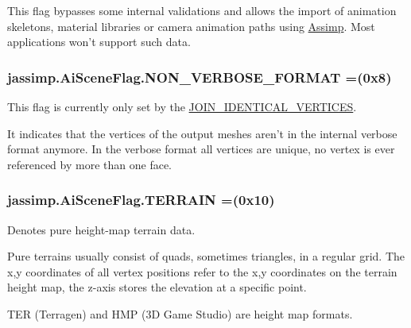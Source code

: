 This flag bypasses some internal validations and allows the import of animation skeletons, material libraries or camera animation paths using \hyperlink{class_assimp}{Assimp}. Most applications won't support such data. \hypertarget{enumjassimp_1_1_ai_scene_flag_a122fd9086bf97b49ca1331e0fe115fad}{
\subsubsection[{N\+O\+N\+\_\+\+V\+E\+R\+B\+O\+S\+E\+\_\+\+F\+O\+R\+M\+A\+T}]{\setlength{\rightskip}{0pt plus 5cm}jassimp.\+Ai\+Scene\+Flag.\+N\+O\+N\+\_\+\+V\+E\+R\+B\+O\+S\+E\+\_\+\+F\+O\+R\+M\+A\+T =(0x8)}}\label{enumjassimp_1_1_ai_scene_flag_a122fd9086bf97b49ca1331e0fe115fad}
This flag is currently only set by the \hyperlink{enumjassimp_1_1_ai_post_process_steps_a8a0dc401e418d7e18272cb5bac85ca45}{J\+O\+I\+N\+\_\+\+I\+D\+E\+N\+T\+I\+C\+A\+L\+\_\+\+V\+E\+R\+T\+I\+C\+E\+S}.

It indicates that the vertices of the output meshes aren't in the internal verbose format anymore. In the verbose format all vertices are unique, no vertex is ever referenced by more than one face. \hypertarget{enumjassimp_1_1_ai_scene_flag_af27d32494468c26b8f3857f7507ac401}{
\subsubsection[{T\+E\+R\+R\+A\+I\+N}]{\setlength{\rightskip}{0pt plus 5cm}jassimp.\+Ai\+Scene\+Flag.\+T\+E\+R\+R\+A\+I\+N =(0x10)}}\label{enumjassimp_1_1_ai_scene_flag_af27d32494468c26b8f3857f7507ac401}
Denotes pure height-\/map terrain data.

Pure terrains usually consist of quads, sometimes triangles, in a regular grid. The x,y coordinates of all vertex positions refer to the x,y coordinates on the terrain height map, the z-\/axis stores the elevation at a specific point.

T\+E\+R (Terragen) and H\+M\+P (3\+D Game Studio) are height map formats. 

